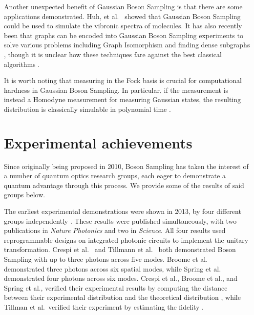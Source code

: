 Another unexpected benefit of Gaussian Boson Sampling is that there are some applications demonstrated. Huh, et al.~\cite{huh2015} showed that Gaussian Boson Sampling could be used to simulate the vibronic spectra of molecules. It has also recently been that graphs can be encoded into Gaussian Boson Sampling experiments to solve various problems including Graph Isomorphism and finding dense subgraphs \cite{bradler2018, schuld2019, arrazola2018}, though it is unclear how these techniques fare against the best classical algorithms \cite{aaronson2019mottebailey}.

It is worth noting that measuring in the Fock basis is crucial for computational hardness in Gaussian Boson Sampling. In particular, if the measurement is instead a Homodyne measurement for measuring Gaussian states, the resulting distribution is classically simulable in polynomial time \cite{bartlett2003}.

\section{Experimental achievements}
\label{sec:experimental-achievements}

Since originally being proposed in 2010, Boson Sampling has taken the interest of a number of quantum optics research groups, each eager to demonstrate a quantum advantage through this process. We provide some of the results of said groups below.

The earliest experimental demonstrations were shown in 2013, by four different groups independently \cite{broome2013, spring2013, tillmann2013, crespi2013}. These results were published simultaneously, with two publications in \emph{Nature Photonics} and two in \emph{Science}. All four results used reprogrammable designs on integrated photonic circuits to implement the unitary transformation. Crespi et al.~\cite{crespi2013} and Tillmann et al.~\cite{tillmann2013} both demonstrated Boson Sampling with up to three photons across five modes. Broome et al.~\cite{broome2013} demonstrated three photons across six spatial modes, while Spring et al.~\cite{spring2013} demonstrated four photons across six modes. Crespi et al., Broome et al., and Spring et al., verified their experimental results by computing the distance between their experimental distribution and the theoretical distribution \cite{spring2013, tillmann2013, crespi2013}, while Tillman et al.\ verified their experiment by estimating the fidelity \cite{tillmann2013}.

